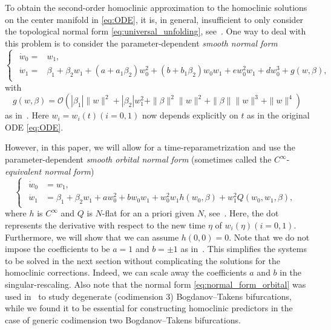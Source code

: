 To obtain the second-order homoclinic approximation to the homoclinic solutions
on the center manifold in \cref{eq:ODE}, it is, in general, insufficient to
only consider the topological normal form \cref{eq:universal_unfolding},
see~\cite{Broer1991}.  One way to deal with this problem is to consider the parameter-dependent {\it smooth normal form} 
\begin{equation}
\label{eq:BT_smooth_nf}
\begin{cases}
\begin{aligned}
\dot{w}_0 = & w_1,\\
\dot{w}_1 = & \beta_1+\beta_2 w_1+\left(a+a_1\beta_2\right)w_0^{2}
 +\left(b+b_1\beta_2\right) w_0w_1+ew_0^{2}w_1+dw_0^{3} + g(w,\beta),
\end{aligned}
\end{cases}
\end{equation}
with
\[
    g(w,\beta) = \mathcal O(|\beta_1|\|w\|^2 + |\beta_2| w_1^2 + \|\beta\|^2\|w\|^2
					 + \|\beta\|\|w\|^3 + \|w\|^4)
\] 
as in~\cite{Gray-Scott2015,Al-Hdaibat2016}. Here $w_i=w_i(t)(i=0,1)$ now
depends explicitly on $t$ as in the original ODE \cref{eq:ODE}.

However, in this paper, we will allow for a time-reparametrization and use the parameter-dependent {\it smooth orbital normal form} (sometimes called the $C^\infty$-{\it equivalent normal form}) 
\begin{equation}
\label{eq:normal_form_orbital}
\begin{cases}
\begin{aligned}
	\dot w_0 &= w_1, \\
	\dot w_1 &= \beta_1 + \beta_2 w_1 + aw_0^2 + b w_0 w_1 + w_0^2 w_1
								h(w_0,\beta) + w_1^2 Q(w_0,w_1,\beta),
\end{aligned}
\end{cases}
\end{equation}
where $h$ is $C^\infty$ and $Q$ is $N$-flat for an a priori given $N$,
see~\cite{Broer1991}. Here, the dot represents the derivative with respect to
the new time $\eta$ of $w_i(\eta)(i=0,1)$.  Furthermore, we will show that we
can assume $h(0,0)=0$. Note that we do not impose the coefficients to be $a=1$
and $b=\pm 1$ as in~\cite{Broer1991}. This simplifies the systems to be solved
in the next section without complicating the solutions for the homoclinic
corrections. Indeed, we can scale away the coefficients $a$ and $b$ in the
singular-rescaling. Also note that the normal form
\cref{eq:normal_form_orbital} was used in~\cite{Broer1991} to study degenerate
(codimension 3) Bogdanov--Takens bifurcations, while we found it to be essential
for constructing homoclinic predictors in the case of generic codimension two
Bogdanov--Takens bifurcations.

